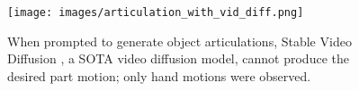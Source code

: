 \begin{figure}[!t]
   \texttt{[image: images/articulation\_with\_vid\_diff.png]}
    \caption{
        When prompted to generate object articulations, Stable Video Diffusion \cite{blattmann2023stable}, a SOTA video diffusion model, cannot produce the desired part motion; only hand motions were observed.}

    \vspace{-3mm}
\label{fig:diff_articulation}
\end{figure}